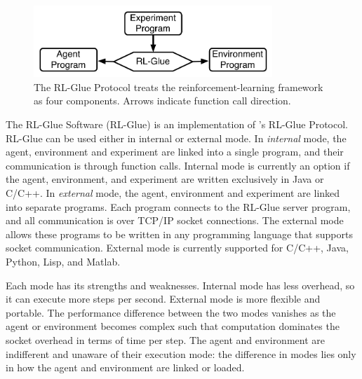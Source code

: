 \documentclass[twoside,11pt]{article}
\begin{document}
\begin{figure}[ht]
\begin{center}
\includegraphics[width=9cm]{glue.pdf}
\vspace{-0.2cm}
\caption{\small The RL-Glue Protocol treats the reinforcement-learning framework as four components.  Arrows indicate function call direction.}\label{fig:RLDIA}
\end{center}
\vspace{-0.4cm}
\end{figure}


The RL-Glue Software (RL-Glue) is an implementation of \citeauthor{whiteThesis}'s RL-Glue Protocol.  RL-Glue can be used either in  internal or external mode.  In \textit{internal} mode, the agent, environment and experiment are linked into a single program, and their communication is through function calls.  Internal mode is currently an option if the agent, environment, and experiment are written exclusively in Java or C/C++.  In  \textit{external} mode, the agent, environment and experiment are linked into separate programs.  Each program connects to the RL-Glue server program, and all communication is over TCP/IP socket connections. The external mode allows these programs to be written in any programming language that supports socket communication.  External mode is currently supported for C/C++, Java, Python, Lisp, and Matlab.

Each mode has its strengths and weaknesses. Internal mode has less overhead, so it can execute more steps per second. External mode is more flexible and portable.  The performance difference between the two modes vanishes as the agent or environment becomes complex such that computation dominates the socket overhead in terms of time per step.  The agent and environment are indifferent and unaware of their execution mode: the difference in modes lies only in how the agent and environment are linked or loaded.
\end{document}

